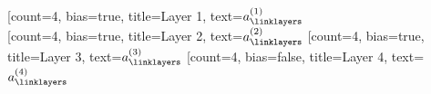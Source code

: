 \documentclass{article}
\begin{document}
\begin{neuralnetwork}[height=5]
  \newcommand{\x}[2]{$x_#2$}
  \newcommand{\hfirst}[2]{\small $a^{(1)}_#2$}
  \newcommand{\hsecond}[2]{\small $a^{(2)}_#2$}
  \newcommand{\hthird}[2]{\small $a^{(3)}_#2$}
  \newcommand{\hforth}[2]{\small $a^{(4)}_#2$}
  \hiddenlayer[count=4, bias=true, title=Layer 1, text=\hfirst] \linklayers\\
  \hiddenlayer[count=4, bias=true, title=Layer 2, text=\hsecond] \linklayers
  \hiddenlayer[count=4, bias=true, title=Layer 3, text=\hthird] \linklayers
  \hiddenlayer[count=4, bias=false, title=Layer 4, text=\hforth] \linklayers
\end{neuralnetwork}
\end{document}
